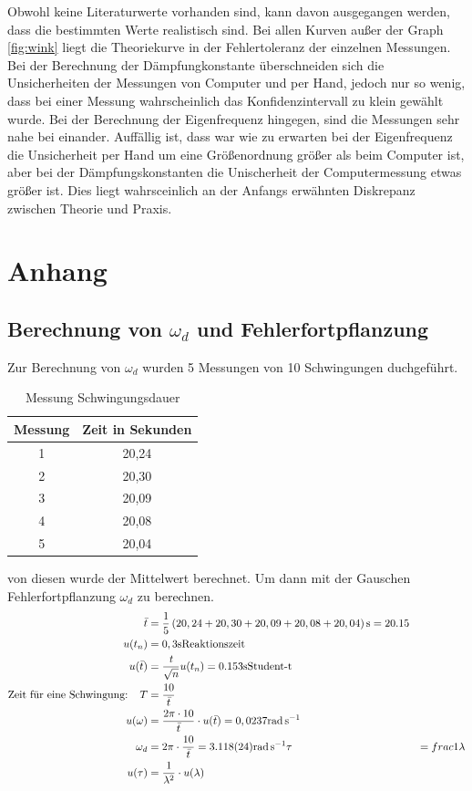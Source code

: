 \documentclass[11pt, a4paper]{article}
\begin{document}
    Obwohl keine Literaturwerte vorhanden sind, kann davon ausgegangen werden, dass die bestimmten Werte realistisch sind.
    Bei allen Kurven außer der Graph \ref{fig:wink} liegt die Theoriekurve in der Fehlertoleranz der einzelnen Messungen.
    Bei der Berechnung der Dämpfungkonstante überschneiden sich die Unsicherheiten der Messungen von Computer und per Hand,
    jedoch nur so  wenig, dass bei einer Messung wahrscheinlich das Konfidenzintervall zu klein gewählt wurde. Bei der
    Berechnung der Eigenfrequenz hingegen, sind die Messungen sehr nahe bei einander. Auffällig ist, dass war wie zu
    erwarten bei der Eigenfrequenz die Unsicherheit per Hand um eine Größenordnung größer als beim Computer ist,
    aber bei der Dämpfungskonstanten die Unischerheit der Computermessung etwas größer ist. Dies liegt wahrsceinlich an der Anfangs
    erwähnten Diskrepanz zwischen Theorie und Praxis.

    \section{Anhang}

    \subsection{Berechnung von $\omega_d$ und Fehlerfortpflanzung} \label{sec:omega}
    Zur Berechnung von $\omega_d$ wurden 5 Messungen von 10 Schwingungen duchgeführt.
    \begin{table}
        \centering
        \begin{tabular}{c c}
            Messung & Zeit in Sekunden \\ \hline
            1 & 20,24 \\
            2 & 20,30 \\
            3 & 20,09 \\
            4 & 20,08 \\
            5 & 20,04
        \end{tabular}
        \caption{Messung Schwingungsdauer}
        \label{Tab:messen}
    \end{table}
    von diesen wurde der Mittelwert berechnet. Um dann mit der Gauschen Fehlerfortpflanzung \cite[(19)]{ABW} $\omega_d$ zu berechnen.
    \begin{align}
        \bar{t} &= \frac{1}{5} \left(20,24 + 20,30 + 20,09 + 20,08 + 20,04 \right) \si{\second} = 20.15 \\
        u(t_n) &= 0,3 \si{\second} \text{Reaktionszeit} \\
        u(\bar{t}) &= \frac{{\it t}}{\sqrt{n}} u(t_n) = 0.153 \si{\second} \text{Student-t} \\
        \text{Zeit für eine Schwingung: } \ \ T &= \frac{10}{\bar{t}} \\
        u(\omega) &= \frac{2 \pi \cdot 10}{\bar{t}} \cdot u(\bar{t}) = 0,0237 \si{\radian\per\second} \\
        \omega_d &= 2 \pi \cdot \frac{10}{\bar{t}} = 3.118(24) \si{\radian\per\second}
        \tau &= frac{1}{\lambda} \\
        u(\tau) &= \frac{1}{\lambda^2} \cdot u(\lambda)
    \end{align}


    
    
\end{document}
